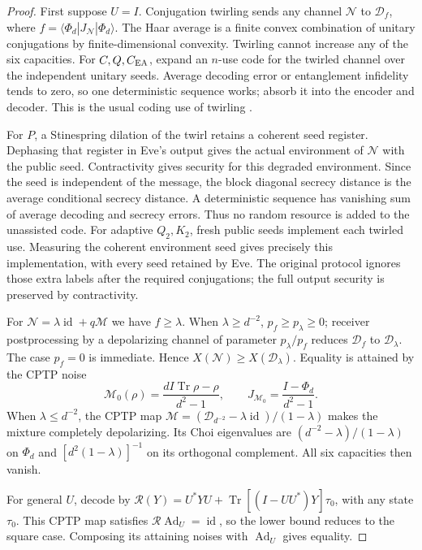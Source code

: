\documentclass[11pt]{article}
\newcommand{\Tr}{\operatorname{Tr}}
\newcommand{\id}{\operatorname{id}}
\begin{document}
\begin{proof}
First suppose $U=I$. Conjugation twirling sends any channel $\mathcal N$
to $\mathcal D_f$, where $f=\langle\Phi_d|J_{\mathcal N}|\Phi_d\rangle$.
The Haar average is a finite convex combination of unitary conjugations
by finite-dimensional convexity. Twirling cannot increase any of the
six capacities. For $C,Q,C_{\rm EA}$, expand an $n$-use code for the
twirled channel over the independent unitary seeds. Average decoding
error or entanglement infidelity tends to zero, so one deterministic
sequence works; absorb it into the encoder and decoder. This is the
usual coding use of twirling \cite[Appendix B]{bdsw}.

For $P$, a Stinespring dilation of the twirl retains a coherent seed
register. Dephasing that register in Eve's output gives the actual
environment of $\mathcal N$ with the public seed. Contractivity gives
security for this degraded environment. Since the seed is independent
of the message, the block diagonal secrecy distance is the average
conditional secrecy distance. A deterministic sequence has vanishing
sum of average decoding and secrecy errors. Thus no random resource
is added to the unassisted code. For adaptive $Q_2,K_2$, fresh public
seeds implement each twirled use. Measuring the coherent environment
seed gives precisely this implementation, with every seed retained by
Eve. The original protocol ignores those extra labels after the required
conjugations; the full output security is preserved by contractivity.

For $\mathcal N=\lambda\id+q\mathcal M$ we have $f\ge\lambda$.
When $\lambda\ge d^{-2}$, $p_f\ge p_\lambda\ge0$; receiver
postprocessing by a depolarizing channel of parameter $p_\lambda/p_f$
reduces $\mathcal D_f$ to $\mathcal D_\lambda$. The case $p_f=0$ is
immediate. Hence $X(\mathcal N)\ge X(\mathcal D_\lambda)$.
Equality is attained by the CPTP noise
\[
 \mathcal M_0(\rho)=\frac{dI\Tr\rho-\rho}{d^2-1},
 \qquad J_{\mathcal M_0}=\frac{I-\Phi_d}{d^2-1}.
\]
When $\lambda\le d^{-2}$, the CPTP map
$\mathcal M=(\mathcal D_{d^{-2}}-\lambda\id)/(1-\lambda)$
makes the mixture completely depolarizing. Its Choi eigenvalues are
$(d^{-2}-\lambda)/(1-\lambda)$ on $\Phi_d$ and
$[d^2(1-\lambda)]^{-1}$ on its orthogonal complement.
All six capacities then vanish.

For general $U$, decode by
$\mathcal R(Y)=U^*YU+\Tr[(I-UU^*)Y]\tau_0$, with any state $\tau_0$.
This CPTP map satisfies $\mathcal R\operatorname{Ad}_U=\id$,
so the lower bound reduces to the square case. Composing its attaining
noises with $\operatorname{Ad}_U$ gives equality.
\end{proof}
\end{document}
